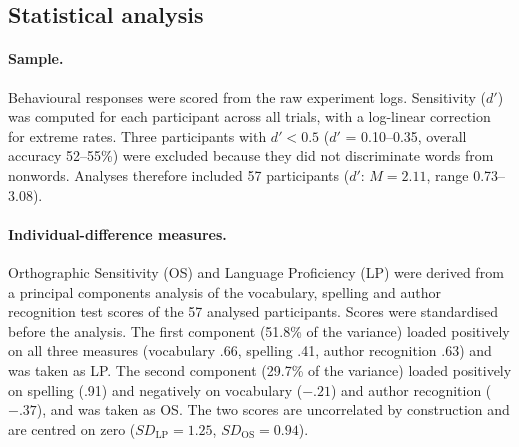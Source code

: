 
\subsection{Statistical analysis}

\paragraph{Sample.}
Behavioural responses were scored from the raw experiment logs. Sensitivity
($d'$) was computed for each participant across all trials, with a log-linear
correction for extreme rates. Three participants with $d' < 0.5$ ($d'$ =
0.10--0.35, overall accuracy 52--55\%) were excluded because they did not
discriminate words from nonwords. Analyses therefore included 57 participants
($d'$: $M = 2.11$, range 0.73--3.08).

\paragraph{Individual-difference measures.}
Orthographic Sensitivity (OS) and Language Proficiency (LP) were derived from a
principal components analysis of the vocabulary, spelling and author recognition
test scores of the 57 analysed participants. Scores were standardised before the
analysis. The first component (51.8\% of the variance) loaded positively on all
three measures (vocabulary .66, spelling .41, author recognition .63) and was
taken as LP. The second component (29.7\% of the variance) loaded positively on
spelling (.91) and negatively on vocabulary ($-.21$) and author recognition
($-.37$), and was taken as OS. The two scores are uncorrelated by construction
and are centred on zero ($SD_{\text{LP}} = 1.25$, $SD_{\text{OS}} = 0.94$).

